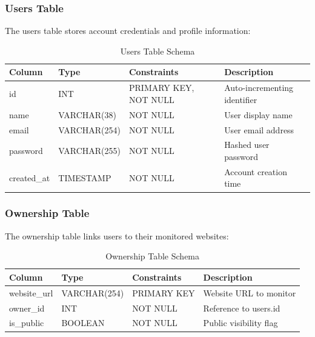 \subsubsection{Users Table}

The users table stores account credentials and profile information:

\begin{table}[H]
    \centering
    \caption{Users Table Schema}
    \label{tab:users-schema}
    \begin{tabular}{llll}
        \toprule
        \textbf{Column} & \textbf{Type} & \textbf{Constraints} & \textbf{Description} \\
        \midrule
        id & INT & PRIMARY KEY, NOT NULL & Auto-incrementing identifier \\
        name & VARCHAR(38) & NOT NULL & User display name \\
        email & VARCHAR(254) & NOT NULL & User email address \\
        password & VARCHAR(255) & NOT NULL & Hashed user password \\
        created\_at & TIMESTAMP & NOT NULL & Account creation time \\
        \bottomrule
    \end{tabular}
\end{table}

\subsubsection{Ownership Table}

The ownership table links users to their monitored websites:

\begin{table}[H]
    \centering
    \caption{Ownership Table Schema}
    \label{tab:ownership-schema}
    \begin{tabular}{llll}
        \toprule
        \textbf{Column} & \textbf{Type} & \textbf{Constraints} & \textbf{Description} \\
        \midrule
        website\_url & VARCHAR(254) & PRIMARY KEY & Website URL to monitor \\
        owner\_id & INT & NOT NULL & Reference to users.id \\
        is\_public & BOOLEAN & NOT NULL & Public visibility flag \\
        \bottomrule
    \end{tabular}
\end{table}

